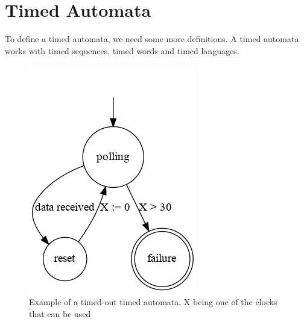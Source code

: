\documentclass[12pt]{article}
\theoremstyle{definition}
\theoremstyle{definition}
\theoremstyle{remark}
\begin{document}
%
%
%



\section{Timed Automata}


To define a timed automata, we need some more definitions. A timed automata works with timed sequences, timed words and timed languages.\\

\begin{figure}[H]
    \centering
    \includegraphics[scale=0.8]{timed_automata.png}
    \caption{Example of a timed-out timed automata. X being one of the clocks that can be used}
    \label{timed_automata_e1}
\end{figure}
\end{document}
